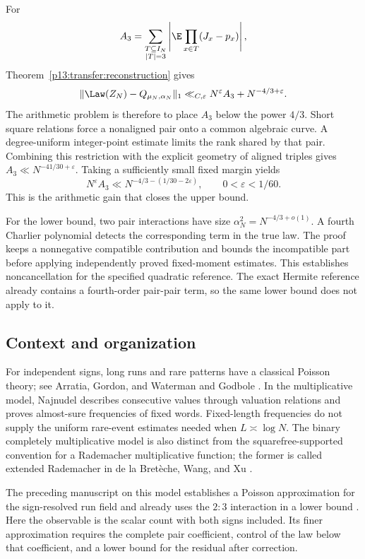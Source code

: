 For
\[
 A_3=\sum_{\substack{T\subseteq I_N\\|T|=3}}
       \left|\E\prod_{x\in T}(J_x-p_x)\right|,
\]
Theorem~\ref{p13:transfer:reconstruction} gives
\[
 \|\Law(Z_N)-Q_{\mu_N,\alpha_N}\|_1
       \ll_{C,\varepsilon}N^\varepsilon A_3
                            +N^{-4/3+\varepsilon}.
\]
The arithmetic problem is therefore to place \(A_3\) below the
power \(4/3\). Short square relations force a nonaligned pair onto
a common algebraic curve. A degree-uniform integer-point estimate
limits the rank shared by that pair. Combining this restriction
with the explicit geometry of aligned triples gives
\(A_3\ll N^{-41/30+\varepsilon}\).
Taking a sufficiently small fixed margin yields
\[
 N^\varepsilon A_3
   \ll N^{-4/3-(1/30-2\varepsilon)},
 \qquad 0<\varepsilon<1/60.
\]
This is the arithmetic gain that closes the upper bound.

For the lower bound, two pair interactions have size
\(\alpha_N^2=N^{-4/3+o(1)}\). A fourth Charlier polynomial detects
the corresponding term in the true law. The proof keeps a
nonnegative compatible contribution and bounds the incompatible
part before applying independently proved fixed-moment estimates.
This establishes noncancellation for the specified quadratic
reference. The exact Hermite reference already contains a fourth-order
pair-pair term, so the same lower bound does not apply to it.

\subsection{Context and organization}

For independent signs, long runs and rare patterns have a classical
Poisson theory; see Arratia, Gordon, and Waterman \cite{agw1990}
and Godbole \cite{godbole1991}. In the multiplicative model,
Najnudel \cite[Lemma~3.1 and Proposition~6.3]{najnudel2020}
describes consecutive values through valuation relations and proves
almost-sure frequencies of fixed words. Fixed-length frequencies do
not supply the uniform rare-event estimates needed when
\(L\asymp\log N\). The binary completely multiplicative model is
also distinct from the squarefree-supported convention for a
Rademacher multiplicative function; the former is called extended
Rademacher in de la Bret\`eche, Wang, and Xu \cite{bretwngxu2026}.

The preceding manuscript on this model establishes a Poisson
approximation for the sign-resolved run field
\cite[Theorem~1.1]{pouly2026c} and already uses the \(2:3\)
interaction in a lower bound \cite[Section~3.6, (3.22)]{pouly2026c}.
Here the observable is the scalar count with both signs included.
Its finer approximation requires the complete pair coefficient,
control of the law below that coefficient, and a lower bound
for the residual after correction.

